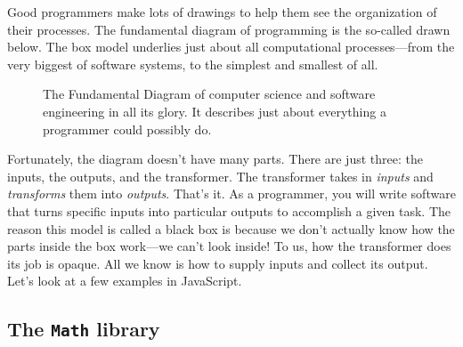 \documentclass{amsart}
\makeatletter
\def\tikzscale{1}\begin{lrbox}{\measure@tikzpicture}%
\edef\tikzscale{\pgfmathresult}%
\makeatother
\begin{document}
Good programmers make lots of drawings to help them see the organization of their processes. The fundamental diagram of programming is the so-called  drawn below. The box model underlies just about all computational processes---from the very biggest of software systems, to the simplest and smallest of all.

\begin{figure}[h]
\begin{scaletikzpicturetowidth}{\textwidth}
\end{scaletikzpicturetowidth}
\caption{\label{fig:intro-fundemental-diagram} The Fundamental Diagram of computer science and software engineering in all its glory. It describes just about everything a programmer could possibly do.}
\end{figure}

Fortunately, the diagram doesn't have many parts. There are just three: the inputs, the outputs, and the transformer. The transformer takes in \emph{inputs} and \emph{transforms} them into \emph{outputs}. That's it. As a programmer, you will write software that turns specific inputs into particular outputs to accomplish a given task. The reason this model is called a black box is because we don't actually know how the parts inside the box work---we can't look inside! To us, how the transformer does its job is opaque. All we know is how to supply inputs and collect its output. Let's look at a few examples in JavaScript.

\subsection{The \texttt{Math} library}
\end{document}

